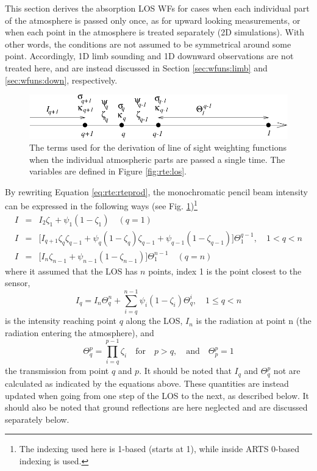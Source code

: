  This section derives the absorption LOS WFs for cases when each
 individual part of the atmosphere is passed only once, as for upward
 looking measurements, or when each point in the atmosphere is treated
 separately (2D simulations). With other words, the conditions are not
 assumed to be symmetrical around some point. Accordingly, 1D limb
 sounding and 1D downward observations are not treated here, and are
 instead discussed in Section \ref{sec:wfuns:limb} and
 \ref{sec:wfuns:down}, respectively.

 \begin{figure}[t]
  \begin{center}
   \includegraphics*[width=0.95\hsize]{Figs/wf1}
   \caption{The terms used for the derivation of line of sight weighting
            functions when the individual atmospheric parts are passed a
            single time. The variables are defined in Figure 
            \ref{fig:rte:los}.}
   \label{fig:wfuns:single}  
  \end{center}
 \end{figure}

 By rewriting Equation \ref{eq:rte:rteprod}, the monochromatic pencil beam
 intensity can be expressed in the following ways (see Fig. 
 \ref{fig:wfuns:single})\footnote{The indexing used here is 1-based 
  (starts at 1), while inside ARTS 0-based indexing is used.}
 \begin{eqnarray}
   I &=& I_2\zeta_1+\psi_1(1-\zeta_1) \quad (q=1) 
     \nonumber \\
   I &=&\Big[I_{q+1}\zeta_q\zeta_{q-1}+\psi_q(1-\zeta_q)\zeta_{q-1} +
            \psi_{q-1}(1-\zeta_{q-1}) \Big] \Theta^{q-1}_1, \quad 1<q<n 
    \label{eq:wfuns:mpbi} \\
   I &=& \Big[I_n\zeta_{n-1}+\psi_{n-1}(1-\zeta_{n-1})\Big]\Theta^{n-1}_{1}
     \quad (q=n)
     \nonumber
 \end{eqnarray}
 where it assumed that the LOS has $n$ points, index 1 is the point
 closest to the sensor,
 \begin{equation}
   I_q = I_n \Theta^{n}_{q} + \sum_{i=q}^{n-1}\psi_i(1-\zeta_i) 
             \Theta_{q}^{i}, \quad 1 \leq q < n
  \label{eq:wfuns:iq}
 \end{equation}
 is the intensity reaching point $q$ along the LOS, $I_n$ is the radiation at
 point n (the radiation entering the atmosphere), and
 \begin{equation}
   \Theta_q^p = \prod_{i=q}^{p-1}\zeta_i\quad \mathrm{for} \quad p>q, 
     \quad \mathrm{and} \quad \Theta_p^p = 1
  \label{eq:wfuns:Theta}
 \end{equation}
 the transmission from point $q$ and $p$. It should be noted that
 $I_q$ and $\Theta_q^p$ not are calculated as indicated by the
 equations above. These quantities are instead updated when going from
 one step of the LOS to the next, as described below. It should also be
 noted that ground reflections are here neglected and are discussed 
 separately below.

